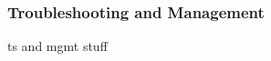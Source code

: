 \renewcommand{\imgpath}{legacy/old-cloud/img}

\subsubsection{Troubleshooting and Management}
ts and mgmt stuff
